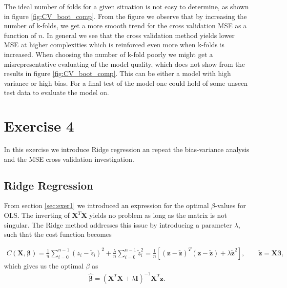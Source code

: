 \documentclass[norsk,a4paper,12pt]{scrartcl}
\renewcommand{\vec}[1]{\mathbf{#1}} %
\begin{document}
The ideal number of folds for a given situation is not easy to determine, as shown in figure \ref{fig:CV_boot_comp}. From the figure we observe that by increasing the number of k-folds, we get a more smooth trend for the cross validation MSE as a function of $n$. In general we see that the cross validation method yields lower MSE at higher complexities which is reinforced even more when k-folds is increased. When choosing the number of k-fold poorly we might get a misrepresentative evaluating of the model quality, which does not show from the results in figure \ref{fig:CV_boot_comp}. This can be either a model with high variance or high bias. For a final test of the model one could hold of some unseen test data to evaluate the model on. 
\\

\section{Exercise 4}
In this exercise we introduce Ridge regression an repeat the bias-variance analysis and the MSE cross validation investigation. 
\subsection{Ridge Regression}
From section \ref{sec:exer1} we introduced an expression for the optimal $\beta$-values for OLS. The inverting of $\vec{X}^T\vec{X}$ yields no problem as long as the matrix is not singular. The Ridge method addresses this issue by introducing a parameter $\lambda$, such that the cost function becomes

\begin{align*}
    C(\vec{X}, \boldsymbol{\beta})=\frac{1}{n} \sum_{i=0}^{n-1}\left(z_{i}-\tilde{z}_i\right)^{2} + \frac{\lambda}{n} \sum_{i=0}^{n-1}\tilde{z}_i^2 =
    \frac{1}{n}\left[(\boldsymbol{z}-\boldsymbol{\tilde{z}})^{T}(\boldsymbol{z}-\boldsymbol{\tilde{z}}) + \lambda\boldsymbol{\tilde{z}}^2 \right], \qquad \vec{\tilde{z}} = \vec{X}\boldsymbol{\beta},
\end{align*}
which gives us the optimal $\beta$ as 
\begin{align*}
    \hat{\boldsymbol{\beta}} = (\vec{X}^T\vec{X} + \lambda \boldsymbol{I} )^{-1}\vec{X}^T\vec{z}.
\end{align*}
\end{document}
